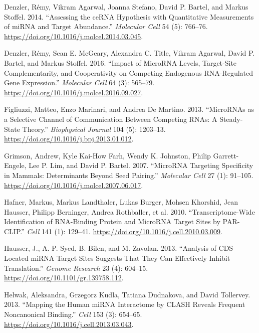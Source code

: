 \documentclass[]{article}
\begin{document}
\leavevmode\hypertarget{ref-denzler_assessing_2014}{}%
Denzler, Rémy, Vikram Agarwal, Joanna Stefano, David P. Bartel, and
Markus Stoffel. 2014. ``Assessing the ceRNA Hypothesis with Quantitative
Measurements of miRNA and Target Abundance.'' \emph{Molecular Cell} 54
(5): 766--76. \url{https://doi.org/10.1016/j.molcel.2014.03.045}.

\leavevmode\hypertarget{ref-denzler_impact_2016}{}%
Denzler, Rémy, Sean E. McGeary, Alexandra C. Title, Vikram Agarwal,
David P. Bartel, and Markus Stoffel. 2016. ``Impact of MicroRNA Levels,
Target-Site Complementarity, and Cooperativity on Competing Endogenous
RNA-Regulated Gene Expression.'' \emph{Molecular Cell} 64 (3): 565--79.
\url{https://doi.org/10.1016/j.molcel.2016.09.027}.

\leavevmode\hypertarget{ref-figliuzzi_micrornas_2013}{}%
Figliuzzi, Matteo, Enzo Marinari, and Andrea De Martino. 2013.
``MicroRNAs as a Selective Channel of Communication Between Competing
RNAs: A Steady-State Theory.'' \emph{Biophysical Journal} 104 (5):
1203--13. \url{https://doi.org/10.1016/j.bpj.2013.01.012}.

\leavevmode\hypertarget{ref-grimson_microrna_2007}{}%
Grimson, Andrew, Kyle Kai-How Farh, Wendy K. Johnston, Philip
Garrett-Engele, Lee P. Lim, and David P. Bartel. 2007. ``MicroRNA
Targeting Specificity in Mammals: Determinants Beyond Seed Pairing.''
\emph{Molecular Cell} 27 (1): 91--105.
\url{https://doi.org/10.1016/j.molcel.2007.06.017}.

\leavevmode\hypertarget{ref-hafner_transcriptome-wide_2010}{}%
Hafner, Markus, Markus Landthaler, Lukas Burger, Mohsen Khorshid, Jean
Hausser, Philipp Berninger, Andrea Rothballer, et al. 2010.
``Transcriptome-Wide Identification of RNA-Binding Protein and MicroRNA
Target Sites by PAR-CLIP.'' \emph{Cell} 141 (1): 129--41.
\url{https://doi.org/10.1016/j.cell.2010.03.009}.

\leavevmode\hypertarget{ref-hausser_analysis_2013}{}%
Hausser, J., A. P. Syed, B. Bilen, and M. Zavolan. 2013. ``Analysis of
CDS-Located miRNA Target Sites Suggests That They Can Effectively
Inhibit Translation.'' \emph{Genome Research} 23 (4): 604--15.
\url{https://doi.org/10.1101/gr.139758.112}.

\leavevmode\hypertarget{ref-helwak_mapping_2013}{}%
Helwak, Aleksandra, Grzegorz Kudla, Tatiana Dudnakova, and David
Tollervey. 2013. ``Mapping the Human miRNA Interactome by CLASH Reveals
Frequent Noncanonical Binding.'' \emph{Cell} 153 (3): 654--65.
\url{https://doi.org/10.1016/j.cell.2013.03.043}.
\end{document}

